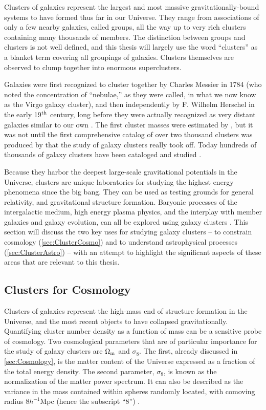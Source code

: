 Clusters of galaxies represent the largest and most massive gravitationally-bound systems to have formed thus far in our Universe. They range from associations of only a few nearby galaxies, called groups, all the way up to very rich clusters containing many thousands of members. The distinction between groups and clusters is not well defined, and this thesis will largely use the word ``clusters'' as a blanket term covering all groupings of galaxies. Clusters themselves are observed to clump together into enormous superclusters.

Galaxies were first recognized to cluster together by Charles Messier in 1784 (who noted the concentration of ``nebulae,'' as they were called, in what we now know as the Virgo galaxy cluster), and then independently by F. Wilhelm Herschel in the early 19$^{\rm th}$ century, long before they were actually recognized as very distant galaxies similar to our own \citep{Biviano00}. The first cluster masses were estimated by \citet{Zwicky33}, but it was not until the first comprehensive catalog of over two thousand clusters was produced by \citet{Abell58} that the study of galaxy clusters really took off. Today hundreds of thousands of galaxy clusters have been cataloged and studied \citep[see e.g.][]{Wen12}.

Because they harbor the deepest large-scale gravitational potentials in the Universe, clusters are unique laboratories for studying the highest energy phenomena since the big bang. They can be used as testing grounds for general relativity, and gravitational structure formation. Baryonic processes of the intergalactic medium, high energy plasma physics, and the interplay with member galaxies and galaxy evolution, can all be explored using galaxy clusters \citep{Kravtsov12}. This section will discuss the two key uses for studying galaxy clusters -- to constrain cosmology (\autoref{sec:ClusterCosmo}) and to understand astrophysical processes (\autoref{sec:ClusterAstro}) -- with an attempt to highlight the significant aspects of these areas that are relevant to this thesis.

\subsection{Clusters for Cosmology}
\label{sec:ClusterCosmo}
Clusters of galaxies represent the high-mass end of structure formation in the Universe, and the most recent objects to have collapsed gravitationally. Quantifying cluster number density as a function of mass can be a sensitive probe of cosmology. Two cosmological parameters that are of particular importance for the study of galaxy clusters are $\Omega_{\rm m}$ and $\sigma_8$. The first, already discussed in \autoref{sec:Cosmology}, is the matter content of the Universe expressed as a fraction of the total energy density. The second parameter, $\sigma_8$, is known as the normalization of the matter power spectrum. It can also be described as the variance in the mass contained within spheres randomly located, with comoving radius $8 h^{-1}$Mpc (hence the subscript ``8'') \citep{DavisPeebles83,White93}.

